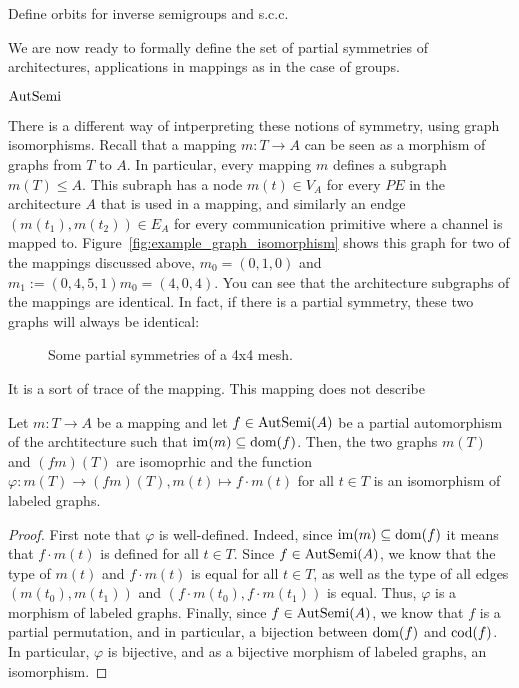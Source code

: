 
Define orbits for inverse semigroups and s.c.c.

We are now ready to formally define the set of partial symmetries of architectures, applications in mappings as in the case of groups.
\begin{defn}
$\operatorname{AutSemi}$
\end{defn}

There is a different way of intperpreting these notions of symmetry, using graph isomorphisms.
Recall that a mapping $m: T \rightarrow A$ can be seen as a morphism of graphs from $T$ to $A$.
In particular, every mapping $m$ defines a subgraph $m(T) \leq A$.
This subraph has a node $m(t) \in V_A$ for every $PE$ in the architecture $A$ that is used in a mapping, and similarly an endge $(m(t_1),m(t_2)) \in E_A$ for every communication primitive where a channel is mapped to.
Figure~\ref{fig:example_graph_isomorphism} shows this graph for two of the mappings discussed above, $m_0 = (0,1,0)$ and $m_1 := (0,4,5,1)m_0 = (4,0,4)$. 
You can see that the architecture subgraphs of the mappings are identical. In fact, if there is a partial symmetry, these two graphs will always be identical:

\begin{figure}[h]
	\centering
   \resizebox{0.55\textwidth}{!}{}
	\caption{Some partial symmetries of a 4x4 mesh.}
	\label{fig:partial_symmetries_4x4}
\end{figure}
It is a sort of trace of the mapping. This mapping does not describe 

\begin{lem}
\label{lem:symmetry_to_iso}
Let $m : T \rightarrow A$ be a mapping and let $f \in \operatorname{AutSemi}(A)$ be a partial automorphism of the archtitecture such that $\operatorname{im}(m) \subseteq \operatorname{dom}(f)$. Then, the two graphs $m(T)$ and $(fm)(T)$ are isomoprhic and the function $\varphi: m(T) \rightarrow (fm)(T), m(t) \mapsto f \cdot m(t)$ for all $t \in T$ is an isomorphism of labeled graphs.
\begin{proof}
First note that $\varphi$ is well-defined. Indeed, since $\operatorname{im}(m) \subseteq \operatorname{dom}(f)$ it means that $f \cdot m(t)$ is defined for all $t \in T$. Since $f \in \operatorname{AutSemi}(A)$, we know that the type of $m(t)$ and $f \cdot m(t)$ is equal for all $t \in T$, as well as the type of all edges $(m(t_0),m(t_1))$ and  $(f \cdot m(t_0), f \cdot m(t_1))$ is equal. Thus, $\varphi$ is a morphism of labeled graphs. Finally, since $f \in \operatorname{AutSemi}(A)$, we know that $f$ is a partial permutation, and in particular, a bijection between $\operatorname{dom}(f)$ and $\operatorname{cod}(f)$. In particular, $\varphi$ is bijective, and as a bijective morphism of labeled graphs, an isomorphism. 
\end{proof}
\end{lem}

